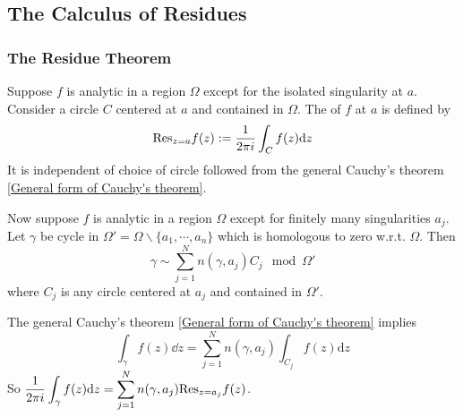 
\subsection{The Calculus of Residues}
\subsubsection{The Residue Theorem}
Suppose  $ f  $ is analytic in a region  $ \Omega  $ except for the isolated singularity at  $ a  $. Consider a circle  $ C  $ centered at  $ a  $ and contained in  $ \Omega  $. The  of  $ f $ at  $ a  $ is defined by 
\begin{equation}
    \mathrm{Res}_{z=a}f(z):=\displaystyle\frac{1 }{2\pi i}\int_Cf(z)\mathrm{d}z
\end{equation} 
It is independent of choice of circle followed from the general Cauchy's theorem \ref{General form of Cauchy's theorem}.

Now suppose  $ f  $ is analytic in a region  $ \Omega  $ except for finitely many singularities  $ a_j $. Let  $ \gamma  $ be cycle in  $ \Omega'=\Omega\backslash\{a_1,\cdots,a_n\} $ which is homologous to zero w.r.t.  $ \Omega $. Then  
\begin{equation}
    \gamma\sim\sum_{j=1}^Nn(\gamma,a_j)C_j\mod \Omega'
\end{equation}  
where  $ C_j $ is any circle centered at  $ a_j $ and contained in  $ \Omega' $.

The general Cauchy's theorem  \ref{General form of Cauchy's theorem} implies 
\begin{equation}
    \int_\gamma f(z)\dd z=\sum_{j=1}^N n(\gamma,a_j)\int_{C_j}f(z)\mathrm{d}z
\end{equation}
So  $ \displaystyle\frac{1}{2\pi i}\int_\gamma f(z)\mathrm{d} z=\sum_{j=1}^Nn(\gamma,a_j)\mathrm{Res}_{z=a_j}f(z) $.

